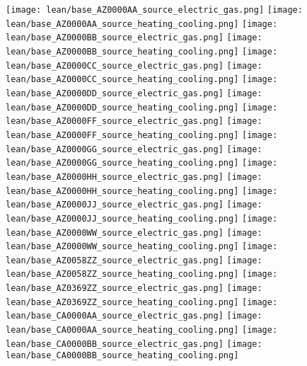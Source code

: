\texttt{[image: lean/base\_AZ0000AA\_source\_electric\_gas.png]}
\texttt{[image: lean/base\_AZ0000AA\_source\_heating\_cooling.png]}
\texttt{[image: lean/base\_AZ0000BB\_source\_electric\_gas.png]}
\texttt{[image: lean/base\_AZ0000BB\_source\_heating\_cooling.png]}
\texttt{[image: lean/base\_AZ0000CC\_source\_electric\_gas.png]}
\texttt{[image: lean/base\_AZ0000CC\_source\_heating\_cooling.png]}
\texttt{[image: lean/base\_AZ0000DD\_source\_electric\_gas.png]}
\texttt{[image: lean/base\_AZ0000DD\_source\_heating\_cooling.png]}
\texttt{[image: lean/base\_AZ0000FF\_source\_electric\_gas.png]}
\texttt{[image: lean/base\_AZ0000FF\_source\_heating\_cooling.png]}
\texttt{[image: lean/base\_AZ0000GG\_source\_electric\_gas.png]}
\texttt{[image: lean/base\_AZ0000GG\_source\_heating\_cooling.png]}
\texttt{[image: lean/base\_AZ0000HH\_source\_electric\_gas.png]}
\texttt{[image: lean/base\_AZ0000HH\_source\_heating\_cooling.png]}
\texttt{[image: lean/base\_AZ0000JJ\_source\_electric\_gas.png]}
\texttt{[image: lean/base\_AZ0000JJ\_source\_heating\_cooling.png]}
\texttt{[image: lean/base\_AZ0000WW\_source\_electric\_gas.png]}
\texttt{[image: lean/base\_AZ0000WW\_source\_heating\_cooling.png]}
\texttt{[image: lean/base\_AZ0058ZZ\_source\_electric\_gas.png]}
\texttt{[image: lean/base\_AZ0058ZZ\_source\_heating\_cooling.png]}
\texttt{[image: lean/base\_AZ0369ZZ\_source\_electric\_gas.png]}
\texttt{[image: lean/base\_AZ0369ZZ\_source\_heating\_cooling.png]}
\texttt{[image: lean/base\_CA0000AA\_source\_electric\_gas.png]}
\texttt{[image: lean/base\_CA0000AA\_source\_heating\_cooling.png]}
\texttt{[image: lean/base\_CA0000BB\_source\_electric\_gas.png]}
\texttt{[image: lean/base\_CA0000BB\_source\_heating\_cooling.png]}
